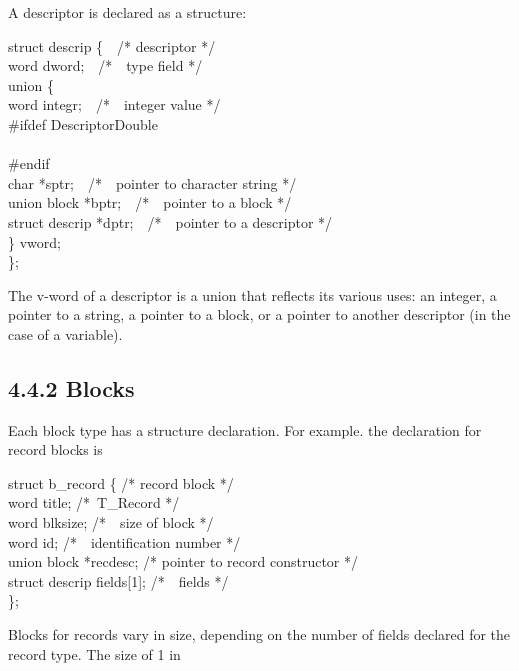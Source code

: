 A descriptor is declared as a structure:

\begin{iconcode}
\>struct descrip \{\ \ /* descriptor */\\
\>\>word dword;\ \ /*\ \ type field */\\
\>\>union \{\\
\>\>\>word integr;\ \ /*\ \ integer value */\\
{\color{blue}\#ifdef DescriptorDouble}\\
\>\>\\
{\color{blue}\#endif}\\
\>\>\>char *sptr;\ \ /*\ \ pointer to character string */\\
\>\>\>union block *bptr;\ \ /*\ \ pointer to a block */\\
\>\>\>struct descrip *dptr;\ \ /*\ \ pointer to a descriptor */\\
\>\>\} vword;\\
\>\};
\end{iconcode}

The v-word of a descriptor is a union that reflects its various uses:
an integer, a pointer to a string, a pointer to a block, or a pointer
to another descriptor (in the case of a variable).

\subsection[4.4.2 Blocks]{4.4.2 Blocks}

Each block type has a structure declaration. For example. the
declaration for record blocks is

\begin{iconcode}
\>struct b\_record \{\>\>\>\>\>\>\>\>\> /* record block */\\
\>\>word title;\>\>\>\>\>\>\>\> /*\ T\_Record */\\
\>\>word blksize;\>\>\>\>\>\>\>\> /*\ \ size of block */\\
\>\> word id;\>\>\>\>\>\>\>\> /*\ \ identification number */\\
\>\>union block *recdesc;\>\>\>\>\>\>\>\> /*   pointer to record constructor */\\
\>\>struct descrip fields[1];\>\>\>\>\>\>\>\> /*\ \ fields */\\
\>\};
\end{iconcode}

Blocks for records vary in size, depending on the number of fields
declared for the record type. The size of 1 in

